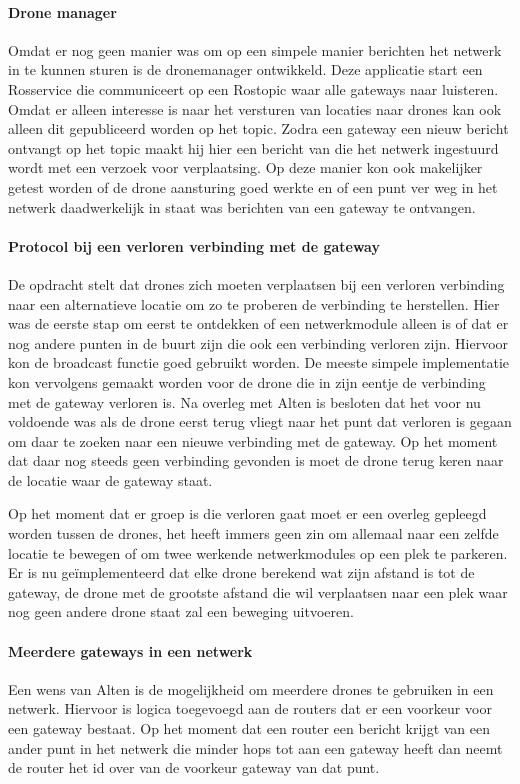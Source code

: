 \documentclass[a4paper, 11pt, oneside]{report}
\begin{document}
\paragraph{Drone manager}
Omdat er nog geen manier was om op een simpele manier berichten het netwerk in te kunnen sturen is de dronemanager ontwikkeld. Deze applicatie start een Rosservice die communiceert op een Rostopic waar alle gateways naar luisteren. Omdat er alleen interesse is naar het versturen van locaties naar drones kan ook alleen dit gepubliceerd worden op het topic. Zodra een gateway een nieuw bericht ontvangt op het topic maakt hij hier een bericht van die het netwerk ingestuurd wordt met een verzoek voor verplaatsing. Op deze manier kon ook makelijker getest worden of de drone aansturing goed werkte en of een punt ver weg in het netwerk daadwerkelijk in staat was berichten van een gateway te ontvangen.

\paragraph{Protocol bij een verloren verbinding met de gateway}
De opdracht stelt dat drones zich moeten verplaatsen bij een verloren verbinding naar een alternatieve locatie om zo te proberen de verbinding te herstellen. Hier was de eerste stap om eerst te ontdekken of een netwerkmodule alleen is of dat er nog andere punten in de buurt zijn die ook een verbinding verloren zijn. Hiervoor kon de broadcast functie goed gebruikt worden. De meeste simpele implementatie kon vervolgens gemaakt worden voor de drone die in zijn eentje de verbinding met de gateway verloren is. Na overleg met Alten is besloten dat het voor nu voldoende was als de drone eerst terug vliegt naar het punt dat verloren is gegaan om daar te zoeken naar een nieuwe verbinding met de gateway. Op het moment dat daar nog steeds geen verbinding gevonden is moet de drone terug keren naar de locatie waar de gateway staat.   

Op het moment dat er groep is die verloren gaat moet er een overleg gepleegd worden tussen de drones, het heeft immers geen zin om allemaal naar een zelfde locatie te bewegen of om twee werkende netwerkmodules op een plek te parkeren. 
Er is nu geïmplementeerd dat elke drone berekend wat zijn afstand is tot de gateway, de drone met de grootste afstand die wil verplaatsen naar een plek waar nog geen andere drone staat zal een beweging uitvoeren.  
   
\paragraph{Meerdere gateways in een netwerk}
Een wens van Alten is de mogelijkheid om meerdere drones te gebruiken in een netwerk. 
Hiervoor is logica toegevoegd aan de routers dat er een voorkeur voor een gateway bestaat.
Op het moment dat een router een bericht krijgt van een ander punt in het netwerk die minder hops tot aan een gateway heeft dan neemt de router het id over van de voorkeur gateway van dat punt. 
\end{document}
